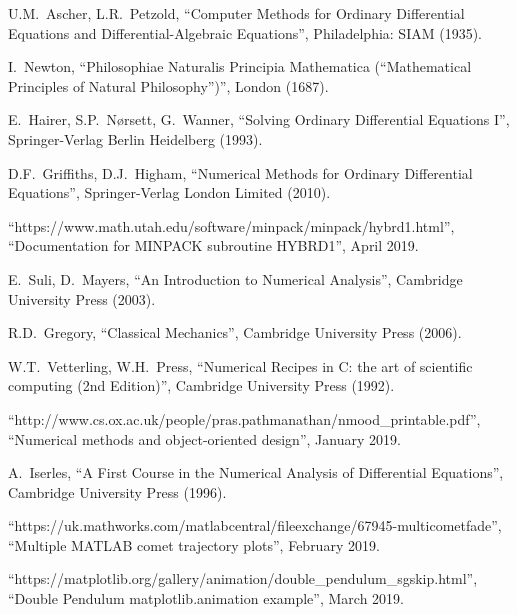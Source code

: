 \documentclass[12pt, twoside]{report}
\theoremstyle{plain}
\theoremstyle{definition}
\theoremstyle{definition}
\begin{document}
\begin{thebibliography}{50}
        U.M.~Ascher, L.R.~Petzold,
        ``Computer Methods for Ordinary Differential Equations and 
        Differential-Algebraic Equations'',
        Philadelphia: SIAM (1935).

        I.~Newton,
        ``Philosophiae Naturalis Principia Mathematica (“Mathematical
        Principles of Natural Philosophy”)'',
        London (1687).

        E.~Hairer, S.P.~N{\o}rsett, G.~Wanner,
        ``Solving Ordinary Differential Equations I'',
        Springer-Verlag Berlin Heidelberg (1993).

        D.F.~Griffiths, D.J.~Higham,
        ``Numerical Methods for Ordinary Differential Equations'',
        Springer-Verlag London Limited (2010).

        ``https://www.math.utah.edu/software/minpack/minpack/hybrd1.html'', 
        ``Documentation for MINPACK subroutine HYBRD1'',
        April 2019.

        E.~Suli, D.~Mayers,
        ``An Introduction to Numerical Analysis'',
        Cambridge University Press (2003).

        R.D.~Gregory,
        ``Classical Mechanics'',
        Cambridge University Press (2006).

        W.T.~Vetterling, W.H.~Press,
        ``Numerical Recipes in C: the art of scientific computing (2nd 
        Edition)'',
        Cambridge University Press (1992).

        ``http://www.cs.ox.ac.uk/people/pras.pathmanathan/nmood\_printable.pdf'',
        ``Numerical methods and object-oriented design'',
        January 2019.

        A.~Iserles,
        ``A First Course in the Numerical Analysis of Differential Equations'',
        Cambridge University Press (1996).

        ``https://uk.mathworks.com/matlabcentral/fileexchange/67945-multicometfade'',
        ``Multiple MATLAB comet trajectory plots'',
        February 2019.

        ``https://matplotlib.org/gallery/animation/double\_pendulum\_sgskip.html'',
        ``Double Pendulum matplotlib.animation example'',
        March 2019.

\end{thebibliography}
\end{document}
